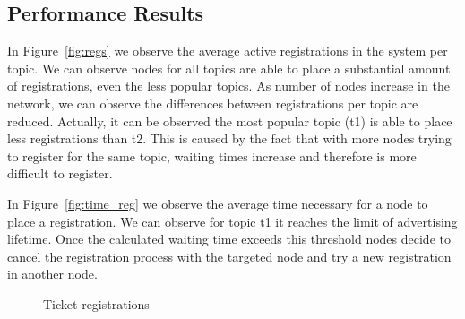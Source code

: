 

\subsection{Performance Results}



In Figure~\ref{fig:regs} we observe the average active registrations in the system per topic. 
We can observe nodes for all topics are able to place a substantial amount of registrations, even the less popular topics. 
As number of nodes increase in the network, we can observe the differences between registrations per topic are reduced. 
Actually, it can be observed the most popular topic (t1) is able to place less registrations than t2. 
This is caused by the fact that with more nodes trying to register for the same topic, waiting times increase and therefore is more difficult to register.

In Figure~\ref{fig:time_reg} we observe the average time necessary for a node to place a registration.
We can observe for topic t1 it reaches the limit of advertising lifetime. Once the calculated waiting time exceeds this threshold
nodes decide to cancel the registration process with the targeted node and try a new registration in another node.




\begin{figure}[!h]
\centering
{} 
\hspace{-0.25cm}
 \caption{Ticket registrations} 
\label{fig:registrations}
\vspace{-0.15in}
\end{figure}   

